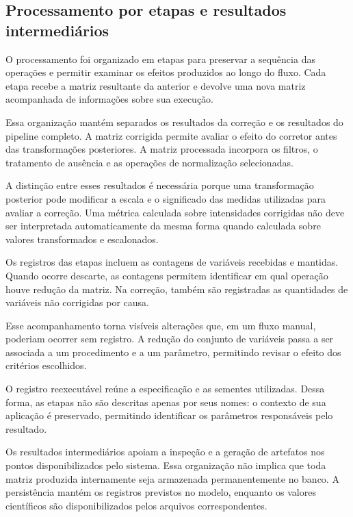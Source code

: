 \subsection{Processamento por etapas e resultados intermediários}
\label{subsec:processamento-etapas}

O processamento foi organizado em etapas para preservar a sequência das operações e permitir examinar os efeitos produzidos ao longo do fluxo. Cada etapa recebe a matriz resultante da anterior e devolve uma nova matriz acompanhada de informações sobre sua execução.

Essa organização mantém separados os resultados da correção e os resultados do pipeline completo. A matriz corrigida permite avaliar o efeito do corretor antes das transformações posteriores. A matriz processada incorpora os filtros, o tratamento de ausência e as operações de normalização selecionadas.

A distinção entre esses resultados é necessária porque uma transformação posterior pode modificar a escala e o significado das medidas utilizadas para avaliar a correção. Uma métrica calculada sobre intensidades corrigidas não deve ser interpretada automaticamente da mesma forma quando calculada sobre valores transformados e escalonados.

Os registros das etapas incluem as contagens de variáveis recebidas e mantidas. Quando ocorre descarte, as contagens permitem identificar em qual operação houve redução da matriz. Na correção, também são registradas as quantidades de variáveis não corrigidas por causa.

Esse acompanhamento torna visíveis alterações que, em um fluxo manual, poderiam ocorrer sem registro. A redução do conjunto de variáveis passa a ser associada a um procedimento e a um parâmetro, permitindo revisar o efeito dos critérios escolhidos.

O registro reexecutável reúne a especificação e as sementes utilizadas. Dessa forma, as etapas não são descritas apenas por seus nomes: o contexto de sua aplicação é preservado, permitindo identificar os parâmetros responsáveis pelo resultado.

Os resultados intermediários apoiam a inspeção e a geração de artefatos nos pontos disponibilizados pelo sistema. Essa organização não implica que toda matriz produzida internamente seja armazenada permanentemente no banco. A persistência mantém os registros previstos no modelo, enquanto os valores científicos são disponibilizados pelos arquivos correspondentes.

